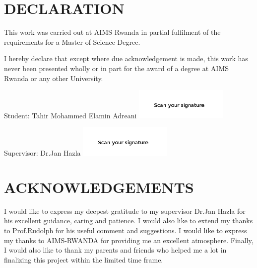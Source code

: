\chapter*{DECLARATION}
This work was carried out at AIMS Rwanda in partial fulfilment of the requirements for a Master of Science Degree.

I hereby declare that except where due acknowledgement is made, this work has never been presented wholly or in part for the award of a degree at AIMS Rwanda or any other University.

\vspace{1.5cm}
Student: Tahir Mohammed Elamin Adreani \includegraphics[height=1.5cm]{images/signature.png}

\vspace{1.5cm}

Supervisor: Dr.Jan Hazla \includegraphics[height=1.5cm]{images/signature1.png}


\newpage

\chapter*{ACKNOWLEDGEMENTS}
I would like to express my deepest gratitude to my supervisor Dr.Jan Hazla for his excellent guidance, caring and patience. I would also like to extend my thanks to Prof.Rudolph for his useful comment and suggestions. I would like to express my thanks to AIMS-RWANDA for providing me an excellent atmosphere. Finally, I would also like to thank my parents and friends who helped me a lot in finalizing this project within the limited time frame.
%
\newpage
%
